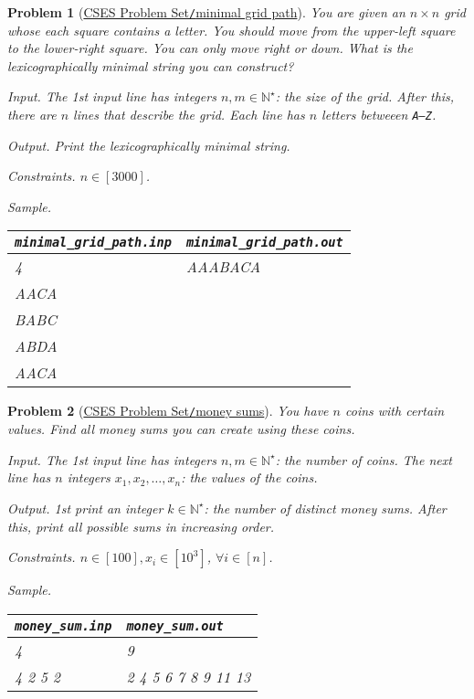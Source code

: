 \documentclass{article}
\newtheorem{problem}{Problem}
\begin{document}
\begin{problem}[\href{https://cses.fi/problemset/task/3359}{CSES Problem Set{\tt/}minimal grid path}]
	You are given an $n\times n$ grid whose each square contains a letter. You should move from the upper-left square to the lower-right square. You can only move right or down. What is the lexicographically minimal string you can construct?
	\item {\sf Input.} The 1st input line has integers $n,m\in\mathbb{N}^\star$: the size of the grid. After this, there are $n$ lines that describe the grid. Each line has $n$ letters betweeen {\tt A--Z}.
	\item {\sf Output.} Print the lexicographically minimal string.
	\item {\sf Constraints.} $n\in[3000]$.
	\item {\sf Sample.}
	\begin{table}[H]
		\centering
		\begin{tabular}{|l|l|}
			\hline
			\verb|minimal_grid_path.inp| & \verb|minimal_grid_path.out| \\
			\hline
			4 & AAABACA \\
			AACA & \\
			BABC & \\
			ABDA & \\
			AACA & \\
			\hline
		\end{tabular}
	\end{table}
\end{problem}

\begin{problem}[\href{https://cses.fi/problemset/task/1745}{CSES Problem Set{\tt/}money sums}]
	You have $n$ coins with certain values. Find all money sums you can create using these coins.
	\item {\sf Input.} The 1st input line has integers $n,m\in\mathbb{N}^\star$: the number of coins. The next line has $n$ integers $x_1,x_2,\ldots,x_n$: the values of the coins.
	\item {\sf Output.} 1st print an integer $k\in\mathbb{N}^\star$: the number of distinct money sums. After this, print all possible sums in increasing order.
	\item {\sf Constraints.} $n\in[100],x_i\in[10^3]$, $\forall i\in[n]$.
	\item {\sf Sample.}
	\begin{table}[H]
		\centering
		\begin{tabular}{|l|l|}
			\hline
			\verb|money_sum.inp| & \verb|money_sum.out| \\
			\hline
			4 & 9 \\
			4 2 5 2 & 2 4 5 6 7 8 9 11 13 \\
			\hline
		\end{tabular}
	\end{table}
\end{problem}
\end{document}
